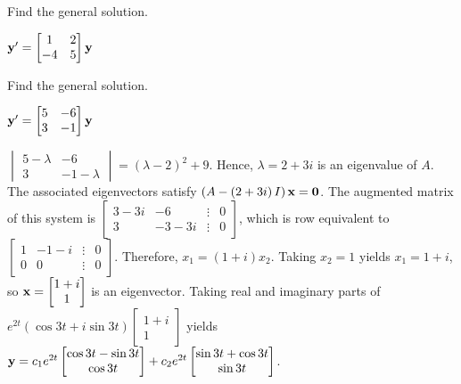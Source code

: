 \documentclass{ximera}
\begin{document}
 \begin{problem}\label{exer:10.6.3}  
 Find the general solution.
 
 $ {\bf y}'= \begin{bmatrix}1&2\\ -4&5\end{bmatrix}{\bf y}$
\end{problem}

 \begin{problem}\label{exer:10.6.4}  
 Find the general solution.
 
 $ {\bf y}'= \begin{bmatrix}5&-6\\3&-1\end{bmatrix}{\bf y}$

 \begin{solution}
     $\begin{vmatrix} 5-\lambda&-6\\ 3&-1-\lambda
\end{vmatrix}=(\lambda-2)^2+9$.
Hence, $\lambda=2+3i$ is an eigenvalue of $A$. The associated
eigenvectors satisfy $\left(A-\left(2+3i\right)I\right){\bf x}={\bf
0}$. The augmented matrix of this system is
$ \begin{bmatrix} 3-3i&-6&\vdots&0\\
3&-3-3i&\vdots&0   \end{bmatrix}$,
which is row equivalent to
$ \begin{bmatrix} 1&-1-i&\vdots&0\\
0&0&\vdots&0
 \end{bmatrix}$.
Therefore,    $x_1=(1+i)x_2$. Taking $x_2=1$ yields $x_1=1+i$, so
${\bf x}= \begin{bmatrix}1+i\\1 \end{bmatrix}$
is an eigenvector.  Taking  real and imaginary parts of
$e^{2t}(\cos3t+i\sin3t)
 \begin{bmatrix}1+i\\1 \end{bmatrix}$ yields
 ${\bf y}=c_1e^{2t} \begin{bmatrix}\cos3t-\sin3t\\\cos3t \end{bmatrix}
+c_2e^{2t} \begin{bmatrix}\sin3t+\cos3t\\\sin3t \end{bmatrix}$.

 \end{solution}
\end{problem}
\end{document}
